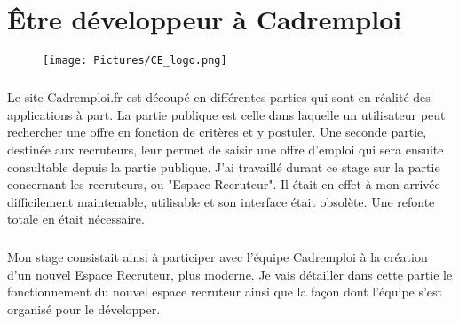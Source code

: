 
\chapter{Être développeur à Cadremploi} %

\label{apports} %


\begin{figure}[h]
  \begin{center}
    \hspace*{-1in}
    \texttt{[image: Pictures/CE\_logo.png]}
  \end{center}
\end{figure}
\paragraph{}
Le site Cadremploi.fr est découpé en différentes parties qui sont en réalité des applications à part.
La partie publique est celle dans laquelle un utilisateur peut rechercher une offre en fonction de critères et y postuler.
Une seconde partie, destinée aux recruteurs, leur permet de saisir une offre d'emploi qui sera ensuite consultable depuis la partie publique.
J'ai travaillé durant ce stage sur la partie concernant les recruteurs, ou "Espace Recruteur".
Il était en effet à mon arrivée difficilement maintenable, utilisable et son interface était obsolète.
Une refonte totale en était nécessaire.
\paragraph{}
Mon stage consistait ainsi à participer avec l'équipe Cadremploi à la création d'un nouvel Espace Recruteur, plus moderne.
Je vais détailler dans cette partie le fonctionnement du nouvel espace recruteur ainsi que la façon dont l'équipe s'est organisé pour le développer.









